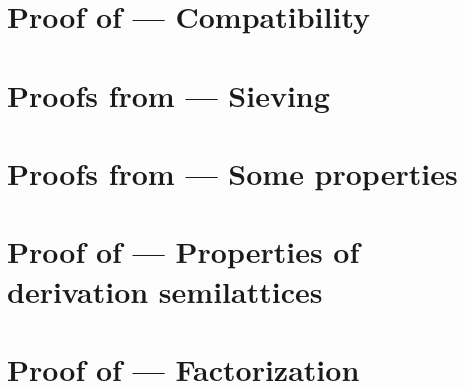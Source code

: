 \section{Proof of  --- Compatibility}
\label{compatibility_of_simulation_residuals_and_permutation_equivalence_proof}


\section{Proofs from  --- Sieving}
\label{sieving_proofs}


\section{Proofs from  --- Some properties}
\label{garbage_some_properties_proof}


\section{Proof of  --- Properties of derivation semilattices}
\label{semilattices_of_garbage_free_and_garbage_derivations_proof}



\section{Proof of  --- Factorization}
\label{factorization_ulb_derivations_proof}



